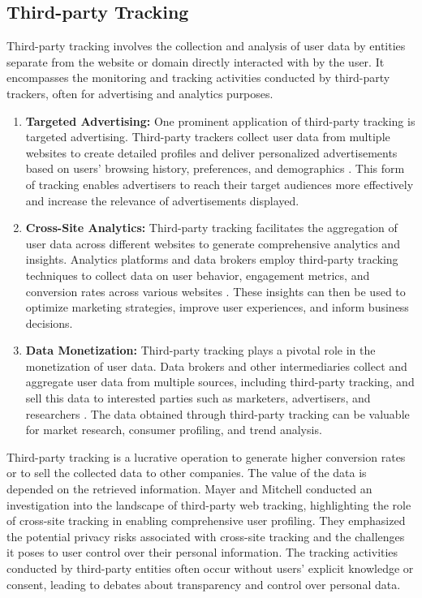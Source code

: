 \subsection{Third-party Tracking}
Third-party tracking involves the collection and analysis of user data by entities separate from the website or domain directly
interacted with by the user. It encompasses the monitoring and tracking activities conducted by third-party trackers, often
for advertising and analytics purposes.
\begin{enumerate}
  \item{\textbf{Targeted Advertising:} One prominent application of third-party tracking is targeted advertising.
      Third-party trackers collect user data from multiple websites to create detailed profiles and deliver personalized
      advertisements based on users' browsing history, preferences, and demographics \cite{agarwal2013not,acquisti2016economics,turow2009americans}. This form of tracking
      enables advertisers to reach their target audiences more effectively and increase the relevance of advertisements displayed.
    }
  \item{\textbf{Cross-Site Analytics:} Third-party tracking facilitates the aggregation of user data across different websites
      to generate comprehensive analytics and insights. Analytics platforms and data brokers employ third-party tracking techniques
      to collect data on user behavior, engagement metrics, and conversion rates across various websites \cite{googleAna}.
      These insights can then be used to optimize marketing strategies, improve user experiences, and inform business decisions.
    }
  \item{\textbf{Data Monetization:} Third-party tracking plays a pivotal role in the monetization of user data. Data brokers and
      other intermediaries collect and aggregate user data from multiple sources, including third-party tracking, and sell this
      data to interested parties such as marketers, advertisers, and researchers \cite{turow2015tradeoff}. The data obtained through
      third-party tracking can be valuable for market research, consumer profiling, and trend analysis.
    }
\end{enumerate}

Third-party tracking is a lucrative operation to generate higher conversion rates or to sell the collected data to other companies.
The value of the data is depended on the retrieved information. Mayer and Mitchell \cite{mayer2012third} conducted an investigation into the landscape of third-party
web tracking, highlighting the role of cross-site tracking in enabling comprehensive user profiling.
They emphasized the potential privacy risks associated with cross-site tracking and the challenges
it poses to user control over their personal information. The tracking activities conducted by third-party
entities often occur without users' explicit knowledge or consent, leading to debates about
transparency and control over personal data.
